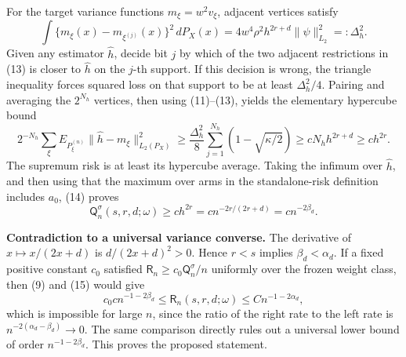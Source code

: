 For the target variance functions \(m_\xi=w^2v_\xi\), adjacent vertices satisfy
\[
\int\{m_\xi(x)-m_{\xi^{(j)}}(x)\}^2\,dP_X(x)
=4w^4\rho^2h^{2r+d}\|\psi\|_{L_2}^2
=:\Delta_h^2.
\tag{13}
\]
Given any estimator \(\widehat h\), decide bit \(j\) by which of the two adjacent restrictions in (13) is closer to \(\widehat h\) on the \(j\)-th support.  If this decision is wrong, the triangle inequality forces squared loss on that support to be at least \(\Delta_h^2/4\).  Pairing and averaging the \(2^{N_h}\) vertices, then using (11)--(13), yields the elementary hypercube bound
\[
2^{-N_h}\sum_\xi
E_{P_\xi^{(n)}}\|\widehat h-m_\xi\|_{L_2(P_X)}^2
\geq \frac{\Delta_h^2}{8}
\sum_{j=1}^{N_h}\left(1-\sqrt{\kappa/2}\right)
\geq cN_hh^{2r+d}
\geq ch^{2r}.
\tag{14}
\]
The supremum risk is at least its hypercube average.  Taking the infimum over \(\widehat h\), and then using that the maximum over arms in the standalone-risk definition includes \(a_0\), (14) proves
\[
\mathsf Q_n^\sigma(s,r,d;\omega)
\geq c h^{2r}
=c n^{-2r/(2r+d)}
=c n^{-2\beta_d}.
\tag{15}
\]

\textbf{Contradiction to a universal variance converse.}
The derivative of \(x\mapsto x/(2x+d)\) is \(d/(2x+d)^2>0\).  Hence \(r<s\) implies \(\beta_d<\alpha_d\).  If a fixed positive constant \(c_0\) satisfied \(\mathsf R_n\geq c_0\mathsf Q_n^\sigma/n\) uniformly over the frozen weight class, then (9) and (15) would give
\[
c_0c n^{-1-2\beta_d}
\leq \mathsf R_n(s,r,d;\omega)
\leq Cn^{-1-2\alpha_d},
\]
which is impossible for large \(n\), since the ratio of the right rate to the left rate is \(n^{-2(\alpha_d-\beta_d)}\to0\).  The same comparison directly rules out a universal lower bound of order \(n^{-1-2\beta_d}\).  This proves the proposed statement.